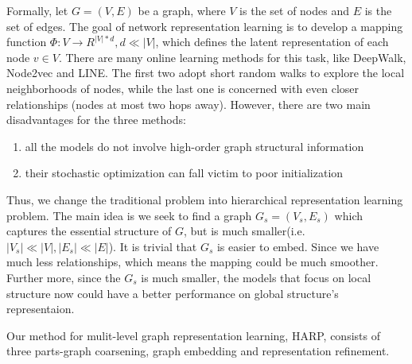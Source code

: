 \documentclass[conference]{IEEEtran}
\begin{document}
Formally, let $G=(V,E)$ be a graph, where $V$ is the set of nodes and $E$ is the set of edges. The goal of network representation learning is to develop a mapping function $\Phi:V\rightarrow R^{|V|*d},d\ll|V|$, which defines the latent representation of each node $v\in V$. There are many online learning methods for this task, like DeepWalk, Node2vec and LINE. The first two adopt short random walks to explore the local neighborhoods of nodes, while the last one is concerned with even closer relationships (nodes at most two hops away). However, there are two main disadvantages for the three methods:
\begin{enumerate}
	\item all the models do not involve high-order graph structural information
	\item their stochastic optimization can fall victim to poor initialization
\end{enumerate}
Thus, we change the traditional problem into hierarchical representation learning problem. The main idea is we seek to find a graph $G_s=(V_s,E_s)$ which captures the essential structure of $G$, but is much smaller(i.e. $|V_s|\ll|V|,|E_s|\ll|E|$). It is trivial that $G_s$ is easier to embed. Since we have much less relationships, which means the mapping could be much smoother. Further more, since the $G_s$ is much smaller, the models that focus on local structure now could have a better performance on global structure's representaion.

Our method for mulit-level graph representation learning, HARP, consists of three parts-graph coarsening, graph embedding and representation refinement.
\end{document}
